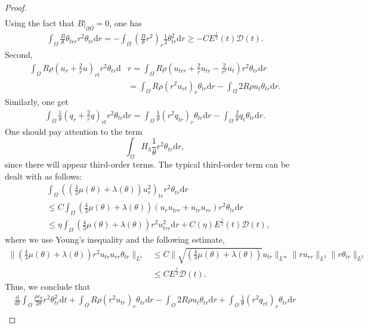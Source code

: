 \documentclass[10pt,a4paper]{amsart}
\newcommand{\dif}{\mathrm{d}}
\begin{document}
\begin{proof}
\begin{align*}
 \end{align*}
 Using the fact that $B|_{\partial \Omega}=0$, one has
 \begin{align*}
 \int_{\Omega} \frac{B}{\theta} \theta_{trr} r^2 \theta_{tr} \dif r =-\int_{\Omega} \left(\frac{B}{\theta} r^2\right)_r \frac{1}{2}\theta_{tr}^2 \dif r \ge -C E^\frac{1}{2}(t) \mathcal D(t).
 \end{align*}
 Second,
 \begin{align*}
 \int_{\Omega}  R \rho \left(u_r+\frac{2}{r}u\right)_{rt} r^2 \theta_{tr}\dif &r=\int_{\Omega} R \rho \left( u_{trr}+\frac{2}{r}u_{tr}-\frac{2}{r^2} u_t\right) r^2 \theta_{tr} \dif r\\
 &=\int_{\Omega} R \rho (r^2 u_{rt})_r \theta_{tr} \dif r-\int_{\Omega} 2 R \rho  u_t \theta_{tr}\dif r.
 \end{align*}
 Similarly, one get
 \begin{align*}
 \int_{\Omega} \frac{1}{\theta} \left(q_r+\frac{2}{r}q\right)_{rt} r^2 \theta_{tr}\dif r =\int_{\Omega} \frac{1}{\theta} (r^2 q_{tr})_r \theta_{tr}\dif r-\int_{\Omega} \frac{2}{\theta} q_t \theta_{tr}\dif r.
 \end{align*}
 One should pay attention to the term
 \[
  \int_{\Omega} H_3 \frac{1}{\theta} r^2 \theta_{tr} \dif r,
  \] since there will appear third-order terms. The typical  third-order term can be dealt with as follows:
  \begin{align*}
 & \int_{\Omega} \left(\left(\frac{4}{3}\mu(\theta)+\lambda(\theta)\right) u_r^2\right)_{tr} r^2 \theta_{tr} \dif r\\
&  \le C\int_{\Omega} \left(\frac{4}{3}\mu(\theta)+\lambda(\theta)\right) (u_r u_{trr}+u_{tr} u_{rr}) r^2 \theta_{tr}\dif r\\
 & \le \eta \int_{\Omega} \left(\frac{4}{3}\mu(\theta)+\lambda(\theta)\right) r^2u_{trr}^2 \dif r+ C(\eta) E^\frac{1}{2}(t) \mathcal D(t),
  \end{align*}
  where we use Young's inequality and the following estimate,
  \begin{align*}
  \| \left(\frac{4}{3}\mu(\theta)+\lambda(\theta)\right)  r^2u_{tr} u_{rr} \theta_{tr}\|_{L^1}&\le C \| \sqrt{\left(\frac{4}{3}\mu(\theta)+\lambda(\theta)\right) } u_{tr}\|_{L^\infty} \|ru_{rr}\|_{L^2} \|r\theta_{tr}\|_{L^2} \\
  &\le C E^\frac{1}{2} \mathcal D(t).
  \end{align*}
 Thus, we conclude that
 \begin{align}
 \frac{\dif}{\dif t} \int_{\Omega} \frac{\rho e_\theta}{2\theta} r^2 \theta_{tr}^2 \dif t+\int_{\Omega} R \rho (r^2 u_{tr})_r \theta_{tr} \dif r-\int_{\Omega} 2 R\rho u_t \theta_{tr} \dif r +\int_{\Omega} \frac{1}{\theta} (r^2 q_{rt})_r\theta_{tr}\dif r \nonumber\\

\end{align}
\end{proof}
\end{document}

